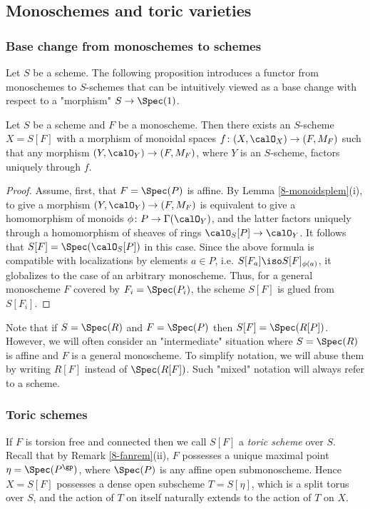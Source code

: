 \documentclass[10pt]{../fichiers-configuration-latex/smfart}
\begin{document}
\subsection{Monoschemes and toric varieties}\label{8-monotoricsec}

\subsubsection{Base change from monoschemes to
schemes}\label{8-monoliftsec} Let $S$ be a scheme. The following
proposition introduces a functor from monoschemes to $S$-schemes
that can be intuitively viewed as a base change with respect to a
"morphism" $S\to\Spec(1)$.

\begin{proposition2}\label{8-monoliftprop} Let $S$ be a scheme
and $F$ be a monoscheme. Then there exists an $S$-scheme $X=S[F]$
with a morphism of monoidal spaces $f{\colon}(X,\calO_X)\to(F,M_F)$
such that any morphism $(Y,\calO_Y)\to(F,M_F)$, where $Y$ is an
$S$-scheme, factors uniquely through $f$.  \end{proposition2}
\begin{proof} Assume, first, that $F=\Spec(P)$ is affine. By Lemma
\ref{8-monoidsplem}(i), to give a morphism $(Y,\calO_Y)\to(F,M_F)$
is equivalent to give a homomorphism of monoids
$\phi{\colon}P\to\Gamma(\calO_Y)$, and the latter factors uniquely
through a homomorphism of sheaves of rings $\calO_S[P]\to\calO_Y$. It
follows that $S[F]=\mathbf{\Spec}(\calO_S[P])$ in this case. Since
the above formula is compatible with localizations by elements $a\in
P$, i.e. $S[F_a]\iso S[F]_{\phi(a)}$, it globalizes to the case of
an arbitrary monoscheme. Thus, for a general monoscheme $F$ covered
by $F_i=\Spec(P_i)$, the scheme $S[F]$ is glued from $S[F_i]$.
\end{proof}

\begin{remark2}\label{8-monoliftremrem} Note that if $S=\Spec(R)$
and $F=\Spec(P)$ then $S[F]=\Spec(R[P])$. However, we will often
consider an "intermediate" situation where $S=\Spec(R)$ is affine
and $F$ is a general monoscheme. To simplify notation, we will
abuse them by writing $R[F]$ instead of $\Spec(R[F])$. Such "mixed"
notation will always refer to a scheme.  \end{remark2}

\subsubsection{Toric schemes}\label{8-toricfansec} If $F$ is torsion
free and connected then we call $S[F]$ a {\em toric scheme} over
$S$. Recall that by Remark \ref{8-fanrem}(ii), $F$ possesses a unique
maximal point $\eta=\Spec(P^\gp)$, where $\Spec(P)$ is any affine
open submonoscheme. Hence $X=S[F]$ possesses a dense open subscheme
$T=S[\eta]$, which is a split torus over $S$, and the action of $T$
on itself naturally extends to the action of $T$ on $X$.
\end{document}
